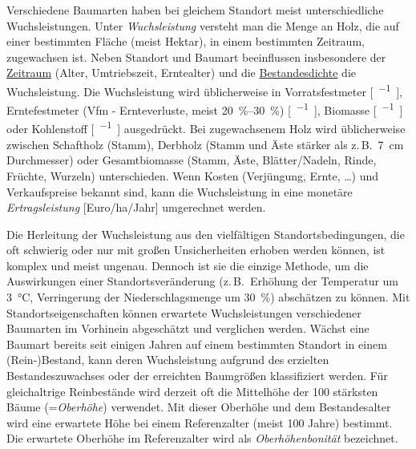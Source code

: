 \documentclass[twocolumn, paper=a4, fontsize=10pt]{scrartcl}
\begin{document}
Verschiedene Baumarten haben bei gleichem Standort meist unterschiedliche Wuchsleistungen. Unter \emph{Wuchsleistung} versteht man die Menge an Holz, die auf einer bestimmten Fläche (meist Hektar), in einem bestimmten Zeitraum, zugewachsen ist. Neben Standort und Baumart beeinflussen insbesondere der \hyperref[sec:AlterUndErntezeitpunkt]{Zeitraum} (Alter, Umtriebszeit, Erntealter) und die \hyperref[sec:StammzahlUndBestandesdichte]{Bestandesdichte} die Wuchsleistung. Die Wuchsleistung wird üblicherweise in Vorratsfestmeter [\unit{\Vfm\per\ha\Jahr}], Erntefestmeter (Vfm - Ernteverluste, meist \qtyrange{20}{30}{\%}) [\unit{\Efm\per\ha\Jahr}], Biomasse [\unit{\tBM\per\ha\Jahr}] oder Kohlenstoff [\unit{\tC\per\ha\Jahr}] ausgedrückt. Bei zugewachsenem Holz wird üblicherweise zwischen Schaftholz (Stamm), Derbholz (Stamm und Äste stärker als z.\,B.\ \qty{7}{\cm} Durchmesser) oder Gesamtbiomasse (Stamm, Äste, Blätter/Nadeln, Rinde, Früchte, Wurzeln) unterschieden. Wenn Kosten (Verjüngung, Ernte, \dots) und Verkaufspreise bekannt sind, kann die Wuchsleistung in eine monetäre \emph{Ertragsleistung} [Euro/ha/Jahr] umgerechnet werden.

Die Herleitung der Wuchsleistung aus den vielfältigen Standortsbedingungen, die oft schwierig oder nur mit großen Unsicherheiten erhoben werden können, ist komplex und meist ungenau. Dennoch ist sie die einzige Methode, um die Auswirkungen einer Standortsveränderung (z.\,B.\ Erhöhung der Temperatur um \qty{3}{\celsius}, Verringerung der Niederschlagsmenge um \qty{30}{\%}) abschätzen zu können. Mit Standortseigenschaften können erwartete Wuchsleistungen verschiedener Baumarten im Vorhinein abgeschätzt und verglichen werden. Wächst eine Baumart bereits seit einigen Jahren auf einem bestimmten Standort in einem (Rein-)Bestand, kann deren Wuchsleistung aufgrund des erzielten Bestandeszuwachses oder der erreichten Baumgrößen klassifiziert werden. Für gleichaltrige Reinbestände wird derzeit oft die Mittelhöhe der 100 stärksten Bäume (=\emph{Oberhöhe}) verwendet. Mit dieser Oberhöhe und dem Bestandesalter wird eine erwartete Höhe bei einem Referenzalter (meist 100 Jahre) bestimmt. Die erwartete Oberhöhe im Referenzalter wird als \emph{Oberhöhenbonität} bezeichnet.
\end{document}

